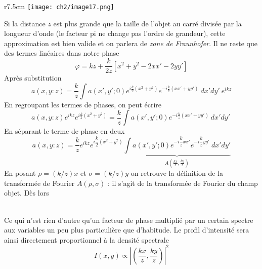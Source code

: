 \begin{wrapfigure}[9]{r}{7.5cm}
\vspace{-5mm}
\texttt{[image: ch2/image17.png]}
\end{wrapfigure}
Si la distance $z$ est plus grande que la taille de l'objet au carré divisée par la longueur 
d'onde (le facteur pi ne change pas l'ordre de grandeur), cette approximation est bien valide
et on  parlera de \textit{zone de Fraunhofer}. Il ne reste que des termes linéaires dans notre 
phase
\begin{equation}
\varphi = kz + \frac{k}{2z}\left[x^2 + y^2 - 2xx'-2yy'\right]
\end{equation}
Après substitution
\begin{equation}
a(x,y:z) = \frac{k}{z}\int a(x',y';0) e^{i\frac{k}{2}(x^2+y^2)}e^{-i\frac{k}{z}(xx'+yy')}\ 
dx'dy'\ e^{ikz}
\end{equation}
En regroupant les termes de phases, on peut écrire
\begin{equation}
a(x,y:z)e^{ikz} e^{i\frac{k}{2}(x^2+y^2)} = \frac{k}{z}\int a(x',y';0) e^{-i\frac{k}{z}(xx'+yy')}\ 
dx'dy'\ 
\end{equation}
En séparant le terme de phase en deux
\begin{equation}
a(x,y:z) = \dfrac{k}{z} e^{ikz} e^{i\dfrac{k}{2}(x^2+y^2)} \underbrace{\int a(x',y';0) e^{-i\dfrac{k
}{z}xx'}e^{-i\dfrac{k}{z}yy'}\ dx'dy'}_{A\left(\frac{kx}{z},\frac{ky}{z}\right)}
\end{equation}
En posant $\rho = (k/z)x$ et $\sigma = (k/z)y$ on retrouve la définition de la transformée de Fourier 
$A(\rho,\sigma)$ : il s'agit de la transformée de Fourier du champ objet. Dès lors\\

\ 

Ce qui n'est rien d'autre qu'un facteur de phase multiplié par un certain spectre aux variables 
un peu plus particulière que d'habitude. Le profil d'intensité sera ainsi directement 
proportionnel à la densité spectrale
\begin{equation}
I(x,y) \propto \left| \left(\frac{kx}{z},\frac{ky}{z}\right) \right|^2
\end{equation}

